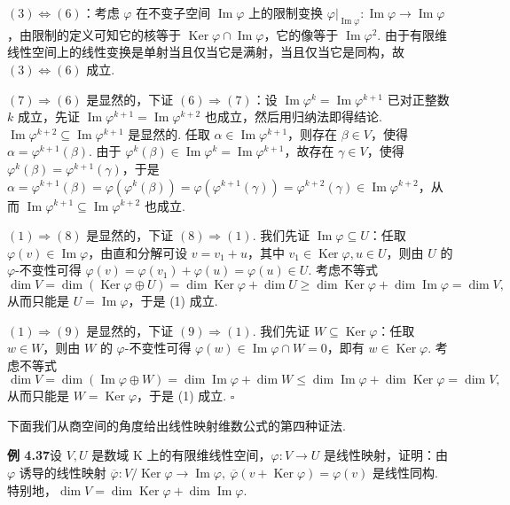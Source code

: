 \documentclass[UTF8,12pt,a4paper,fontset=fandol]{ctexart}
\begin{document}
$(3)\Leftrightarrow(6)$：考虑 $\varphi$ 在不变子空间 $\operatorname{Im}\varphi$ 上的限制变换 $\varphi|_{\operatorname{Im}\varphi}:\operatorname{Im}\varphi\to\operatorname{Im}\varphi$，由限制的定义可知它的核等于 $\operatorname{Ker}\varphi\cap\operatorname{Im}\varphi$，它的像等于 $\operatorname{Im}\varphi^2$. 由于有限维线性空间上的线性变换是单射当且仅当它是满射，当且仅当它是同构，故 $(3)\Leftrightarrow(6)$ 成立.

$(7)\Rightarrow(6)$ 是显然的，下证 $(6)\Rightarrow(7)$：设 $\operatorname{Im}\varphi^k=\operatorname{Im}\varphi^{k+1}$ 已对正整数 $k$ 成立，先证 $\operatorname{Im}\varphi^{k+1}=\operatorname{Im}\varphi^{k+2}$ 也成立，然后用归纳法即得结论. $\operatorname{Im}\varphi^{k+2}\subseteq\operatorname{Im}\varphi^{k+1}$ 是显然的. 任取 $\alpha\in\operatorname{Im}\varphi^{k+1}$，则存在 $\beta\in V$，使得 $\alpha=\varphi^{k+1}(\beta)$. 由于 $\varphi^k(\beta)\in\operatorname{Im}\varphi^k=\operatorname{Im}\varphi^{k+1}$，故存在 $\gamma\in V$，使得 $\varphi^k(\beta)=\varphi^{k+1}(\gamma)$，于是 $\alpha=\varphi^{k+1}(\beta)=\varphi(\varphi^k(\beta))=\varphi(\varphi^{k+1}(\gamma))=\varphi^{k+2}(\gamma)\in\operatorname{Im}\varphi^{k+2}$，从而 $\operatorname{Im}\varphi^{k+1}\subseteq\operatorname{Im}\varphi^{k+2}$ 也成立.

$(1)\Rightarrow(8)$ 是显然的，下证 $(8)\Rightarrow(1)$. 我们先证 $\operatorname{Im}\varphi\subseteq U$：任取 $\varphi(v)\in\operatorname{Im}\varphi$，由直和分解可设 $v=v_1+u$，其中 $v_1\in\operatorname{Ker}\varphi,u\in U$，则由 $U$ 的 $\varphi$-不变性可得 $\varphi(v)=\varphi(v_1)+\varphi(u)=\varphi(u)\in U$. 考虑不等式
\[
\dim V=\dim(\operatorname{Ker}\varphi\oplus U)=\dim\operatorname{Ker}\varphi+\dim U\ge \dim\operatorname{Ker}\varphi+\dim\operatorname{Im}\varphi=\dim V,
\]
从而只能是 $U=\operatorname{Im}\varphi$，于是 (1) 成立.

$(1)\Rightarrow(9)$ 是显然的，下证 $(9)\Rightarrow(1)$. 我们先证 $W\subseteq\operatorname{Ker}\varphi$：任取 $w\in W$，则由 $W$ 的 $\varphi$-不变性可得 $\varphi(w)\in\operatorname{Im}\varphi\cap W=0$，即有 $w\in\operatorname{Ker}\varphi$. 考虑不等式
\[
\dim V=\dim(\operatorname{Im}\varphi\oplus W)=\dim\operatorname{Im}\varphi+\dim W\le \dim\operatorname{Im}\varphi+\dim\operatorname{Ker}\varphi=\dim V,
\]
从而只能是 $W=\operatorname{Ker}\varphi$，于是 (1) 成立. $\square$

下面我们从商空间的角度给出线性映射维数公式的第四种证法.

\noindent\textbf{例 4.37}\quad 设 $V,U$ 是数域 $\mathrm{K}$ 上的有限维线性空间，$\varphi:V\to U$ 是线性映射，证明：由 $\varphi$ 诱导的线性映射 $\overline{\varphi}:V/\operatorname{Ker}\varphi\to\operatorname{Im}\varphi,\ \overline{\varphi}(v+\operatorname{Ker}\varphi)=\varphi(v)$ 是线性同构. 特别地，$\dim V=\dim\operatorname{Ker}\varphi+\dim\operatorname{Im}\varphi$.
\end{document}
